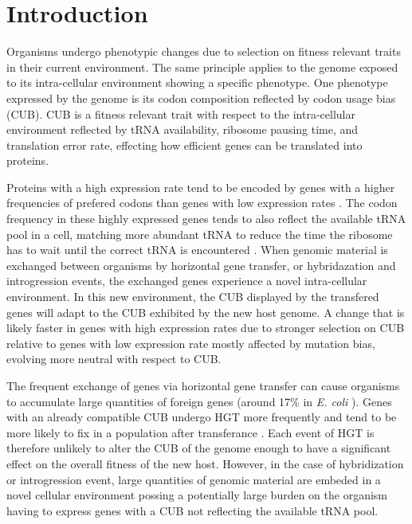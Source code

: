 \documentclass[12pt]{article}
\begin{document}
\section*{Introduction}
Organisms undergo phenotypic changes due to selection on fitness relevant traits in their current environment. 
The same principle applies to the genome exposed to its intra-cellular environment showing a specific phenotype.
One phenotype expressed by the genome is its codon composition reflected by codon usage bias (CUB). 
CUB is a fitness relevant trait with respect to the intra-cellular environment reflected by tRNA availability, ribosome pausing time, and translation error rate, effecting how efficient genes can be translated into proteins. 

Proteins with a high expression rate tend to be encoded by genes with a higher frequencies of prefered codons than genes with low expression rates \citep{grantham1981, ikemura1985, sharp1987, sharp1988, wallace2013, gilchrist2015}.
The codon frequency in these highly expressed genes tends to also reflect the available tRNA pool in a cell, matching more abundant tRNA to reduce the time the ribosome has to wait until the correct tRNA is encountered \citep{dong1996, dosreis2004}.
When genomic material is exchanged between organisms by horizontal gene transfer, or hybridazation and introgression events, the exchanged genes experience a novel intra-cellular environment.
In this new environment, the CUB displayed by the transfered genes will adapt to the CUB exhibited by the new host genome. 
A change that is likely faster in genes with high expression rates due to stronger selection on CUB relative to genes with low expression rate mostly affected by mutation bias, evolving more neutral with respect to CUB.

The frequent exchange of genes via horizontal gene transfer can cause organisms to accumulate large quantities of foreign genes (around 17\% in \textit{E. coli} \citep{lawrence1997}).
Genes with an already compatible CUB undergo HGT more frequently and tend to be more likely to fix in a population after transferance \citep{tuller2011}.
Each event of HGT is therefore unlikely to alter the CUB of the genome enough to have a significant effect on the overall fitness of the new host. 
However, in the case of hybridization or introgression event, large quantities of genomic material are embeded in a novel cellular environment possing a potentially large burden on the organism having to express genes with a CUB not reflecting the available tRNA pool.
 
\end{document}
